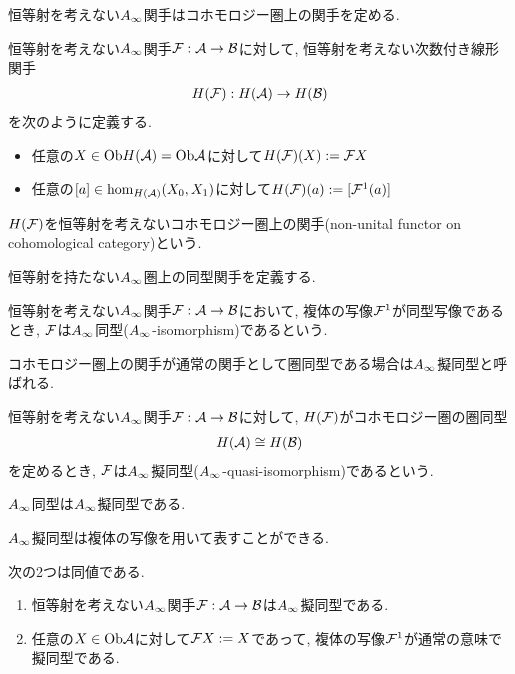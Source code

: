 \documentclass[uplatex, a4paper, 14Q, dvipdfmx]{jsarticle}
\begin{document}
恒等射を考えない$\Ainf$関手はコホモロジー圏上の関手を定める. 

\begin{definition}[恒等射を考えないコホモロジー圏上の関手] \label{prop_F_induces_HF}
  恒等射を考えない$\Ainf$関手$\mathcal{F} : \mathcal{A} \to \mathcal{B}$に対して, 恒等射を考えない次数付き線形関手
  \begin{align*}
    H(\mathcal{F}) : H(\mathcal{A}) \to H(\mathcal{B})
  \end{align*}
  を次のように定義する.
  \begin{itemize}
    \item 任意の$X \in \mathrm{Ob} H(\mathcal{A}) = \mathrm{Ob}\mathcal{A}$に対して$H(\mathcal{F})(X) := \mathcal{F} X$
    \item 任意の$[a] \in \hom_{H(\mathcal{A})}(X_0,X_1)$に対して$H(\mathcal{F})(a) := [\mathcal{F}^1(a)]$
  \end{itemize}
  $H(\mathcal{F})$を恒等射を考えないコホモロジー圏上の関手(non-unital functor on cohomological category)という.
\end{definition}

恒等射を持たない$\Ainf$圏上の同型関手を定義する. 

\begin{definition}[$\Ainf$同型]
  恒等射を考えない$\Ainf$関手$\mathcal{F} : \mathcal{A} \to \mathcal{B}$において, 複体の写像$\mathcal{F}^1$が同型写像であるとき, $\mathcal{F}$は$\Ainf$同型($\Ainf$-isomorphism)であるという.
\end{definition}

コホモロジー圏上の関手が通常の関手として圏同型である場合は$\Ainf$擬同型と呼ばれる. 

\begin{definition}
  恒等射を考えない$\Ainf$関手$\mathcal{F} : \mathcal{A} \to \mathcal{B}$に対して, $H(\mathcal{F})$がコホモロジー圏の圏同型
  \begin{align*}
    H(\mathcal{A}) \cong H(\mathcal{B})
  \end{align*}
  を定めるとき, $\mathcal{F}$は$\Ainf$擬同型($\Ainf$-quasi-isomorphism)であるという. 
\end{definition}

\begin{example}
  $\Ainf$同型は$\Ainf$擬同型である. 
\end{example}

$\Ainf$擬同型は複体の写像を用いて表すことができる. 

\begin{lemma}
  次の2つは同値である. 
  \begin{enumerate}
    \item 恒等射を考えない$\Ainf$関手$\mathcal{F} : \mathcal{A} \to \mathcal{B}$は$\Ainf$擬同型である. 
    \item 任意の$X \in \mathrm{Ob}\mathcal{A}$に対して$\mathcal{F} X := X$であって, 複体の写像$\mathcal{F}^1$が通常の意味で擬同型である. 
  \end{enumerate}
\end{lemma}
\end{document}
